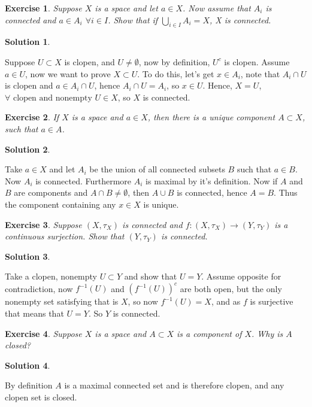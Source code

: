 \documentclass[11pt,a4paper]{article}
\newtheorem{Ex}{Exercise}
\newtheorem{Sol}{Solution}
\begin{document}
\begin{Ex}
	Suppose $X$ is a space and let $a \in X$. Now assume that $A_i$ is connected and $a \in A_i$ $\forall i \in I$. Show that if $\bigcup_{i \in I}A_i = X$, X is connected. 
\end{Ex}

\begin{Sol} \end{Sol}
\noindent Suppose $U \subset X$ is clopen, and $U \neq \emptyset$, now by definition, $U^c$ is clopen. Assume $a \in U$, now we want to prove $X \subset U$. To do this, let's get $x \in A_i$, note that $A_i \cap U$ is clopen and $a \in A_i \cap U$, hence $A_i \cap U = A_i$, so $x \in U$. Hence, $X = U$, $\forall \text{ clopen and nonempty } U \in X$, so $X$ is connected.

\begin{Ex}
	If $X$ is a space and $a \in X$, then there is a unique component $A \subset X$, such that $a \in A$.
\end{Ex}

\begin{Sol} \end{Sol}
\noindent Take $a \in X$ and let $A_i$ be the union of all connected subsets $B$ such that $a \in B$. Now $A_i$ is connected. Furthermore $A_i$ is maximal by it's definition. Now if $A$ and $B$ are components and $A \cap B \neq \emptyset$, then $A \cup B$ is connected, hence $A = B$. Thus the component containing any $x \in X$ is unique.

\begin{Ex}
	Suppose $(X, \tau_X)$ is connected and $f: (X, \tau_X) \rightarrow (Y, \tau_Y)$ is a continuous surjection. Show that $(Y, \tau_Y)$ is connected.
\end{Ex}

\begin{Sol} \end{Sol}
\noindent Take a clopen, nonempty $U \subset Y$ and show that $U = Y$. Assume opposite for contradiction, now $f^{-1}(U)$ and $(f^{-1}(U))^c$ are both open, but the only nonempty set satisfying that is $X$, so now $f^{-1}(U) = X$, and as $f$ is surjective that means that $U = Y$. So $Y$ is connected.

\begin{Ex}
	Suppose $X$ is a space and $A \subset X$ is a component of $X$. Why is $A$ closed?
\end{Ex}

\begin{Sol} \end{Sol}
\noindent By definition $A$ is a maximal connected set and is therefore clopen, and any clopen set is closed.
\end{document}
